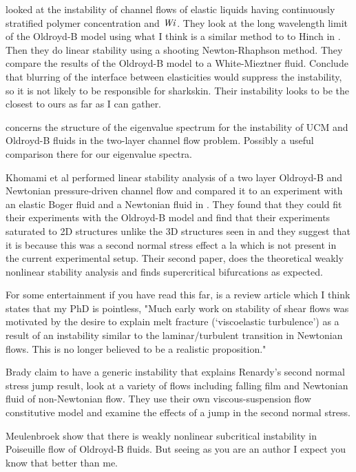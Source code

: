 \documentclass{jfm}
\newcommand\Wi{\mbox{\textit{Wi}}}
\begin{document}
\citet{Wilson1999a} looked at the instability of channel flows of
elastic liquids having continuously stratified polymer concentration and $\Wi$.
They look at the long wavelength limit of the Oldroyd-B model using what I
think is a similar method to to Hinch in \citet{Azaiez1994}. Then they do
linear stability using a shooting Newton-Rhaphson method. They compare the
results of the Oldroyd-B model to a White-Mieztner fluid. Conclude that
blurring of the interface between elasticities would suppress the instability,
so it is not likely to be responsible for sharkskin. Their instability looks to
be the closest to ours as far as I can gather.

\citet{Wilson1999b} concerns the structure of the eigenvalue spectrum
for the instability of UCM and Oldroyd-B fluids in the two-layer channel flow
problem. Possibly a useful comparison there for our eigenvalue spectra.

Khomami et al performed linear stability analysis of a two layer Oldroyd-B and
Newtonian pressure-driven channel flow and compared it to an experiment with an
elastic Boger fluid and a Newtonian fluid in \citep{Khomami2000a, Khomami2000b}.
They found that they could fit their experiments with the Oldroyd-B model and
find that their experiments saturated to 2D structures unlike the 3D structures
seen in \citep{Khomami1997} and they suggest that it is because this was a
second normal stress effect a la \citep{Renardy1999} which is not present in the
current experimental setup. Their second paper, \citep{Khomami2000b} does the
theoretical weakly nonlinear stability analysis and finds supercritical
bifurcations as expected.

For some entertainment if you have read this far, \citep{Renardy2000} is a
review article which I think states that my PhD is pointless, "Much early work
on stability of shear flows was motivated by the desire to explain melt
fracture (‘viscoelastic turbulence’) as a result of an instability similar to
the laminar/turbulent transition in Newtonian flows. This is no longer believed
to be a realistic proposition."

Brady \citep{Brady2002} claim to have a generic instability that explains
Renardy's \citep{Renardy1999} second normal stress jump result, look at a
variety of flows including falling film and Newtonian fluid of non-Newtonian
flow. They use their own viscous-suspension flow constitutive model and
examine the effects of a jump in the second normal stress.

Meulenbroek \citep{Meulenbroek2004} show that there is weakly nonlinear
subcritical instability in Poiseuille flow of Oldroyd-B fluids. But seeing as
you are an author I expect you know that better than me.
\end{document}
